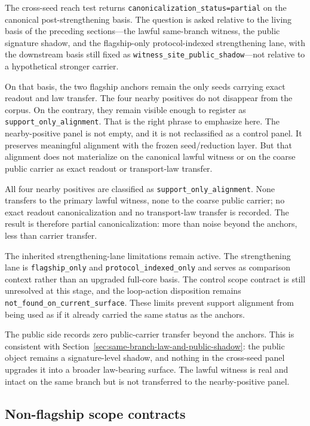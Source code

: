 \documentclass[11pt]{article}
\theoremstyle{definition}
\begin{document}
The cross-seed reach test returns \texttt{canonicalization\_status=partial} on the
canonical post-strengthening basis. The question is asked relative to the living basis
of the preceding sections---the lawful same-branch witness, the public signature
shadow, and the flagship-only protocol-indexed strengthening lane, with the downstream
basis still fixed as \texttt{witness\_site\_public\_shadow}---not relative to a
hypothetical stronger carrier.

On that basis, the two flagship anchors remain the only seeds carrying exact readout and
law transfer. The four nearby positives do not disappear from the corpus. On the
contrary, they remain visible enough to register as \texttt{support\_only\_alignment}.
That is the right phrase to emphasize here. The nearby-positive panel is not empty, and
it is not reclassified as a control panel. It preserves meaningful alignment with the
frozen seed/reduction layer. But that alignment does not materialize on the canonical
lawful witness or on the coarse public carrier as exact readout or transport-law
transfer.

All four nearby positives are classified as \texttt{support\_only\_alignment}. None
transfers to the primary lawful witness, none to the coarse public carrier; no exact
readout canonicalization and no transport-law transfer is recorded. The result is
therefore partial canonicalization: more than noise beyond the anchors, less than
carrier transfer.

The inherited strengthening-lane limitations remain active. The strengthening lane is
\texttt{flagship\_only} and \texttt{protocol\_indexed\_only} and serves as comparison
context rather than an upgraded full-core basis. The control scope contract is still
unresolved at this stage, and the loop-action disposition remains
\texttt{not\_found\_on\_current\_surface}. These limits prevent support alignment from
being used as if it already carried the same status as the anchors.

The public side records zero public-carrier transfer beyond the anchors. This is
consistent with Section~\ref{sec:same-branch-law-and-public-shadow}: the public object
remains a signature-level shadow, and nothing in the cross-seed panel upgrades it into
a broader law-bearing surface. The lawful witness is real and intact on the same
branch but is not transferred to the nearby-positive panel.

\subsection{Non-flagship scope contracts}
\end{document}
